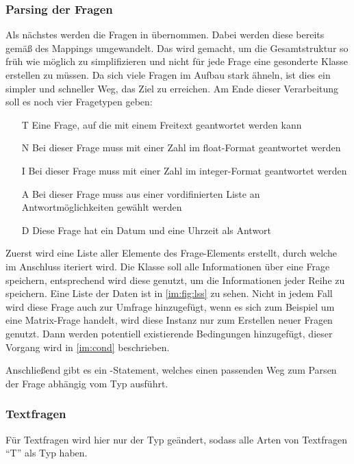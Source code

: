 \subsubsection{Parsing der Fragen}
\label{im:q}

Als nächstes werden die Fragen in  übernommen. Dabei werden diese bereits gemäß des Mappings umgewandelt.
Das wird gemacht, um die Gesamtstruktur so früh wie möglich zu simplifizieren und nicht für jede Frage eine gesonderte Klasse erstellen zu müssen.
Da sich viele Fragen im Aufbau stark ähneln, ist dies ein simpler und schneller Weg, das Ziel zu erreichen.
Am Ende dieser Verarbeitung soll es noch vier Fragetypen geben:

\begin{enumerate}
\item[T] Eine Frage, auf die mit einem Freitext geantwortet werden kann
\item[N] Bei dieser Frage muss mit einer Zahl im float-Format geantwortet werden
\item[I] Bei dieser Frage muss mit einer Zahl im integer-Format geantwortet werden
\item[A] Bei dieser Frage muss aus einer vordifinierten Liste an Antwortmöglichkeiten gewählt werden
\item[D] Diese Frage hat ein Datum und eine Uhrzeit als Antwort
\end{enumerate}

Zuerst wird eine Liste aller  Elemente des Frage-Elements erstellt, durch welche im Anschluss iteriert wird.
Die Klasse  soll alle Informationen über eine Frage speichern, entsprechend wird diese genutzt, um die Informationen jeder Reihe zu speichern.
Eine Liste der Daten ist in \cref{im:fig:lss} zu sehen.
Nicht in jedem Fall wird diese Frage auch zur Umfrage hinzugefügt, wenn es sich zum Beispiel um eine Matrix-Frage handelt, wird diese Instanz nur zum Erstellen neuer Fragen genutzt.
Dann werden potentiell existierende Bedingungen hinzugefügt, dieser Vorgang wird in \cref{im:cond} beschrieben.

Anschließend gibt es ein -Statement, welches einen passenden Weg zum Parsen der Frage abhängig vom Typ ausführt.

\subsubsection{Textfragen}
Für Textfragen wird hier nur der Typ geändert, sodass alle Arten von Textfragen \enquote{T} als Typ haben.

